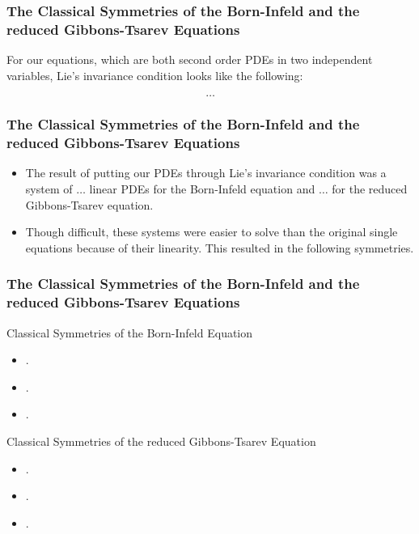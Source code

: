 \documentclass{beamer}
\begin{document}
\begin{frame}
    \frametitle{The Classical Symmetries of the Born-Infeld and the reduced Gibbons-Tsarev Equations}
        For our equations, which are both second order PDEs in two independent variables, Lie's invariance condition looks like the following:
        \vspace*{0.25in}
        \begin{Large}$$\dots$$\end{Large}
\end{frame}


\begin{frame}
    \frametitle{The Classical Symmetries of the Born-Infeld and the reduced Gibbons-Tsarev Equations}
        \begin{itemize}
            \item The result of putting our PDEs through Lie's invariance condition was a system of $\dots$ linear PDEs for the Born-Infeld equation and $\dots$ for the reduced Gibbons-Tsarev equation. \pause
            \item Though difficult, these systems were easier to solve than the original single equations because of their linearity. This resulted in the following symmetries.
        \end{itemize}
\end{frame}


\begin{frame}
    \frametitle{The Classical Symmetries of the Born-Infeld and the reduced Gibbons-Tsarev Equations}
        \begin{large}Classical Symmetries of the Born-Infeld Equation\end{large}
        \begin{itemize}
            \item .
            \item .
            \item .
        \end{itemize}
        \vspace*{0.25in}
        \begin{large}Classical Symmetries of the reduced Gibbons-Tsarev Equation\end{large}
        \begin{itemize}
            \item .
            \item .
            \item .
        \end{itemize}
\end{frame}
\end{document}
